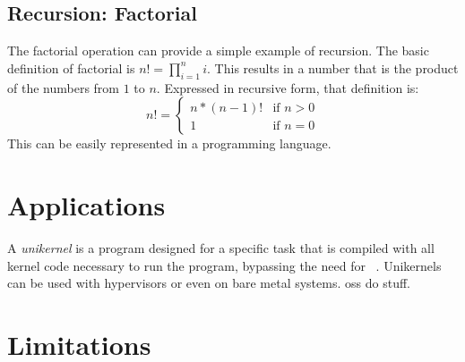 \subsection{Recursion: Factorial}
The factorial operation can provide a simple example of recursion.
The basic definition of factorial is $n!=\prod_{i=1}^n i$.%
This results in a number that is the product of the numbers from $1$ to $n$.
Expressed in recursive form, that definition is:
\begin{equation}
  n!=\begin{cases}
    n * (n - 1)! & \text{if }n > 0 \\
    1 & \text{if }n = 0
  \end{cases}
\end{equation}
This can be easily represented in a programming language. %

\section{Applications}\label{se:cfg_applications}
A \emph{unikernel} is a program designed for a specific task
that is compiled with all kernel code necessary to run the program,
bypassing the need for ~\citep{madhavapeddy2014unikernels}.
Unikernels can be used with hypervisors or even on bare metal systems.
\Acp{os} do stuff.

\section{Limitations}
